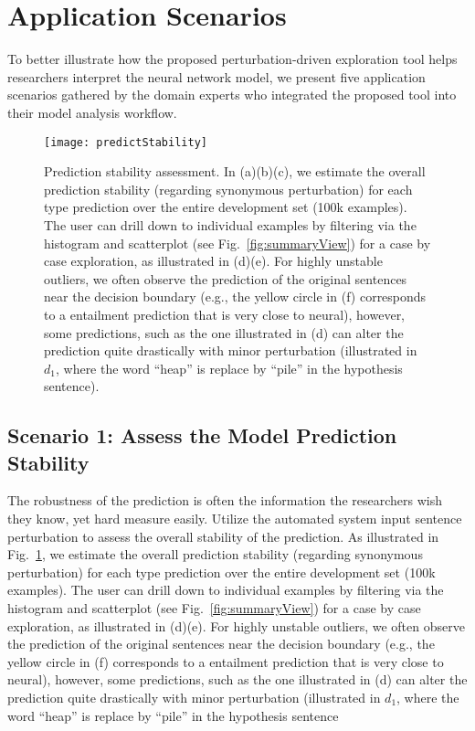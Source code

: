 \section{Application Scenarios}
\label{sec:caseStudy}
To better illustrate how the proposed perturbation-driven exploration tool helps researchers interpret the neural network model, we present five application scenarios gathered by the domain experts who integrated the proposed tool into their model analysis workflow.

\begin{figure}[htbp]
\centering
\vspace{-2mm}
 \texttt{[image: predictStability]}
 \caption{
Prediction stability assessment. In (a)(b)(c), we estimate the overall prediction stability (regarding synonymous perturbation) for each type prediction over the entire development set (100k examples). The user can drill down to individual examples by filtering via the histogram and scatterplot (see Fig.~\ref{fig:summaryView}) for a case by case exploration, as illustrated in (d)(e). For highly unstable outliers, we often observe the prediction of the original sentences near the decision boundary (e.g., the yellow circle in (f) corresponds to a entailment prediction that is very close to neural), however, some predictions, such as the one illustrated in (d) can alter the prediction quite drastically with minor perturbation (illustrated in $d_1$, where the word ``heap'' is replace by ``pile'' in the hypothesis sentence).
%
}
\label{fig:predictStability}
\end{figure}

\subsection{Scenario 1: Assess the Model Prediction Stability}
The robustness of the prediction is often the information the researchers wish they know, yet hard measure easily.
Utilize the automated system input sentence perturbation to assess the overall stability of the prediction.
As illustrated in Fig.~\ref{fig:predictStability}, we estimate the overall prediction stability (regarding synonymous perturbation) for each type prediction over the entire development set (100k examples). The user can drill down to individual examples by filtering via the histogram and scatterplot (see Fig.~\ref{fig:summaryView}) for a case by case exploration, as illustrated in (d)(e). For highly unstable outliers, we often observe the prediction of the original sentences near the decision boundary (e.g., the yellow circle in (f) corresponds to a entailment prediction that is very close to neural), however, some predictions, such as the one illustrated in (d) can alter the prediction quite drastically with minor perturbation (illustrated in $d_1$, where the word ``heap'' is replace by ``pile'' in the hypothesis sentence


